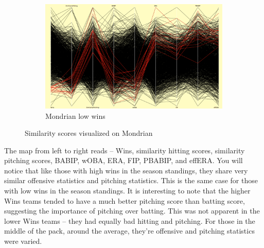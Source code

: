 \documentclass[12pt]{article}
\numberwithin{equation}{subsection}
\begin{document}
\begin{figure}[H]
\begin{subfigure}[b]{0.5\linewidth}
    \centering
    \includegraphics[width=0.9\linewidth]{h4} 
    \caption{Mondrian low wins} 
    \label{fig5:d} 
  \end{subfigure} 
  \caption{Similarity scores visualized on Mondrian}
  \label{fig5} 
\end{figure}

The map from left to right reads -- Wins, similarity hitting scores, similarity pitching scores, BABIP, wOBA, ERA, FIP, PBABIP, and effERA. You will notice that like those with high wins in the season standings, they share very similar offensive statistics and pitching statistics. This is the same case for those with low wins in the season standings. It is interesting to note that the higher Wins teams tended to have a much better pitching score than batting score, suggesting the importance of pitching over batting. This was not apparent in the lower Wins teams -- they had equally bad hitting and pitching. For those in the middle of the pack, around the average, they're offensive and pitching statistics were varied.
\end{document}
